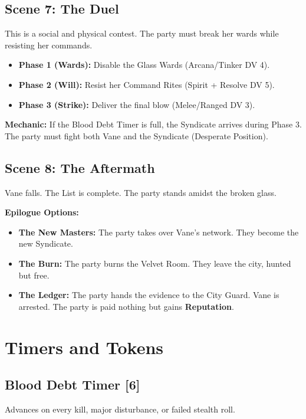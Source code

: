 \documentclass[12pt]{book}
\begin{document}
\section{Scene 7: The Duel}

This is a social and physical contest. The party must break her wards while resisting her commands.

\begin{itemize}
    \item \textbf{Phase 1 (Wards):} Disable the Glass Wards (Arcana/Tinker DV 4).
    \item \textbf{Phase 2 (Will):} Resist her Command Rites (Spirit + Resolve DV 5).
    \item \textbf{Phase 3 (Strike):} Deliver the final blow (Melee/Ranged DV 3).
\end{itemize}

\textbf{Mechanic:} If the Blood Debt Timer is full, the Syndicate arrives during Phase 3. The party must fight both Vane and the Syndicate (Desperate Position).

\section{Scene 8: The Aftermath}

Vane falls. The List is complete. The party stands amidst the broken glass.

\textbf{Epilogue Options:}
\begin{itemize}
    \item \textbf{The New Masters:} The party takes over Vane's network. They become the new Syndicate.
    \item \textbf{The Burn:} The party burns the Velvet Room. They leave the city, hunted but free.
    \item \textbf{The Ledger:} The party hands the evidence to the City Guard. Vane is arrested. The party is paid nothing but gains \textbf{Reputation}.
\end{itemize}

\chapter{Timers and Tokens}

\section{Blood Debt Timer [6]}

Advances on every kill, major disturbance, or failed stealth roll.
\end{document}
